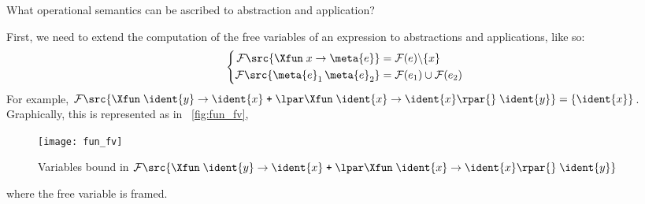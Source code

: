 What operational semantics can be ascribed to abstraction and
application?

First, we need to extend the computation of the free variables of an
expression to abstractions and applications, like so:
\begin{equation*}
\left\{
\begin{aligned}
\mathcal{F} \src{\Xfun \; x \rightarrow \meta{e}} &=
  \mathcal{F} (e) \backslash \{x\}\\
\mathcal{F} \src{\meta{e}_1 \, \meta{e}_2} &=
  \mathcal{F} (e_1) \cup \mathcal{F} (e_2)
\end{aligned}
\right.
\end{equation*}
For example, $\mathcal{F} \src{\Xfun \; \ident{y} \rightarrow \ident{x}
\; \texttt{+} \; \lpar\Xfun \; \ident{x} \rightarrow \ident{x}\rpar{}
\; \ident{y}} = \{\ident{x}\}$. Graphically, this is represented as in
\fig~\vref{fig:fun_fv},
\begin{figure}
\centering
\texttt{[image: fun\_fv]}
\caption{Variables bound in $\mathcal{F} \src{\Xfun \; \ident{y}
    \rightarrow \ident{x} \; \texttt{+} \; \lpar\Xfun \; \ident{x}
  \rightarrow \ident{x}\rpar{} \; \ident{y}}$
\label{fig:fun_fv}}
\end{figure}
where the free variable is framed.


